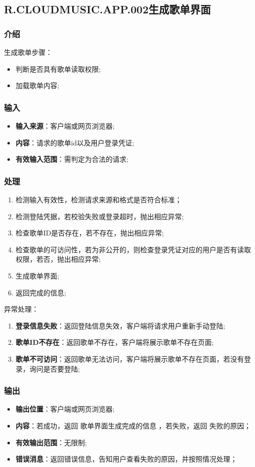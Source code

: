 \subsection{R.CLOUDMUSIC.APP.002生成歌单界面}
\subsubsection{介绍}
生成歌单步骤：
	\begin{itemize}
		\item 判断是否具有歌单读取权限;
		\item 加载歌单内容;
	\end{itemize}
\subsubsection{输入}
	\begin{itemize}
		\item \textbf{输入来源}：客户端或网页浏览器;
		\item \textbf{内容}：请求的歌单id以及用户登录凭证;
		\item \textbf{有效输入范围}：需判定为合法的请求;
	\end{itemize}
\subsubsection{处理}
	\begin{enumerate}
		\item 检测输入有效性，检测请求来源和格式是否符合标准；
		\item 检测登陆凭据，若校验失败或登录超时，抛出相应异常;
		\item 检查歌单ID是否存在，若不存在，抛出相应异常;
		\item 检查歌单的可访问性，若为非公开的，则检查登录凭证对应的用户是否有读取权限，若否，抛出相应异常;
		\item 生成歌单界面;
		\item 返回完成的信息;
	\end{enumerate}
	\noindent 异常处理：
	\begin{enumerate}
		\item \textbf{登录信息失败}：返回登陆信息失效，客户端将请求用户重新手动登陆;
		\item \textbf{歌单ID不存在}：返回歌单不存在，客户端将展示歌单不存在页面;
		\item \textbf{歌单不可访问}：返回歌单无法访问，客户端将展示歌单不存在页面，若没有登录，询问是否要登陆;
	\end{enumerate}
\subsubsection{输出}
\begin{itemize}
	\item \textbf{输出位置}：客户端或网页浏览器;
	\item \textbf{内容}：若成功，返回 歌单界面生成完成的信息 ，若失败，返回 失败的原因；
	\item \textbf{有效输出范围}：无限制;
	\item \textbf{错误消息}：返回错误信息，告知用户查看失败的原因，并按照情况处理；
\end{itemize}

